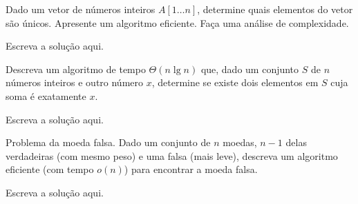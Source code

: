 \documentclass[a4paper]{exam}
\begin{document}
\begin{questions}
  \question Dado um vetor de números inteiros $A[1 \ldots n]$, determine
  quais elementos do vetor são únicos. Apresente um algoritmo eficiente.
  Faça uma análise de complexidade.
  \begin{solution}
    Escreva a solução aqui.
  \end{solution}
  \question Descreva um algoritmo de tempo $\Theta(n \lg n)$ que, dado
  um conjunto $S$ de $n$ números inteiros e outro número $x$, determine
  se existe dois elementos em $S$ cuja soma é exatamente $x$.
  \begin{solution}
    Escreva a solução aqui.
  \end{solution}
  \question Problema da moeda falsa. Dado um conjunto de $n$ moedas,
  $n-1$ delas verdadeiras (com mesmo peso) e uma falsa (mais leve),
  descreva um algoritmo eficiente (com tempo $o(n)$) para encontrar
  a moeda falsa.
  \begin{solution}
    Escreva a solução aqui.
  \end{solution}
  
\end{questions}
\end{document}
